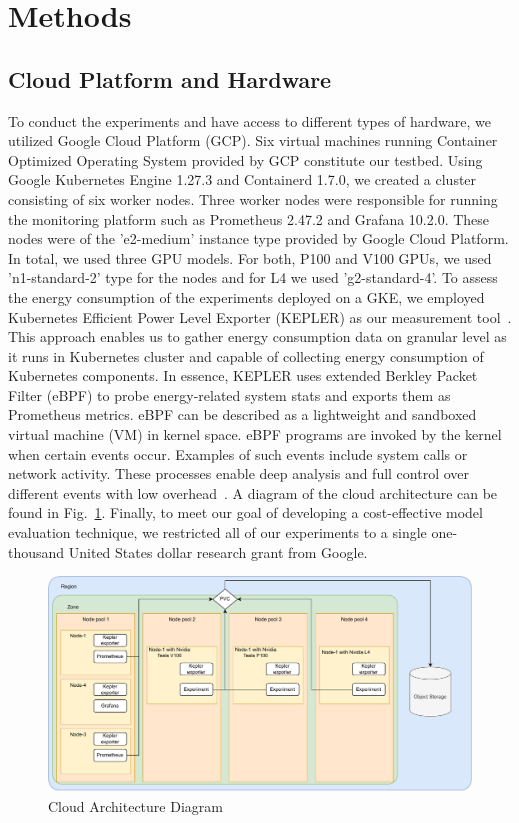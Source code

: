 \documentclass[conference]{IEEEtran}
\begin{document}


\section{Methods}
\subsection{Cloud Platform and Hardware}
To conduct the experiments and have access to different types of hardware, we utilized Google Cloud Platform (GCP). Six virtual machines running Container Optimized Operating System provided by GCP constitute our testbed. Using Google Kubernetes Engine 1.27.3 and Containerd 1.7.0,  we created a cluster consisting of six worker nodes. Three worker nodes were responsible for running the monitoring platform such as Prometheus 2.47.2 and Grafana 10.2.0. These nodes were of the 'e2-medium' instance type provided by Google Cloud Platform. In total, we used three GPU models. For both, P100 and V100 GPUs, we used 'n1-standard-2' type for the nodes and for L4  we used 'g2-standard-4'.
To assess the energy consumption of the experiments deployed on a GKE, we employed Kubernetes Efficient Power Level Exporter (KEPLER) as our measurement tool~\cite{amaral2023kepler}. This approach enables us to gather energy consumption data on granular level as it runs in Kubernetes cluster and capable of collecting energy consumption of Kubernetes components. In essence, KEPLER uses extended Berkley Packet Filter (eBPF) to probe energy-related system stats and exports them as Prometheus metrics. eBPF can be described as a lightweight and sandboxed virtual machine (VM) in kernel space. eBPF programs are invoked by the kernel when certain events occur. Examples of such events include system calls or network activity. These processes enable deep analysis and full control over different events with low overhead~\cite{sedghpour@ebpf}. A diagram of the cloud architecture can be found in Fig.~\ref{fig:architecture}. Finally, to meet our goal of developing a cost-effective model evaluation technique, we restricted all of our experiments to a single one-thousand United States dollar research grant from Google.

\begin{figure}
    \centering
    \includegraphics[width=\textwidth]{plots/architecture.pdf}
    \caption{Cloud Architecture Diagram}
    \label{fig:architecture}
\end{figure}
\end{document}
